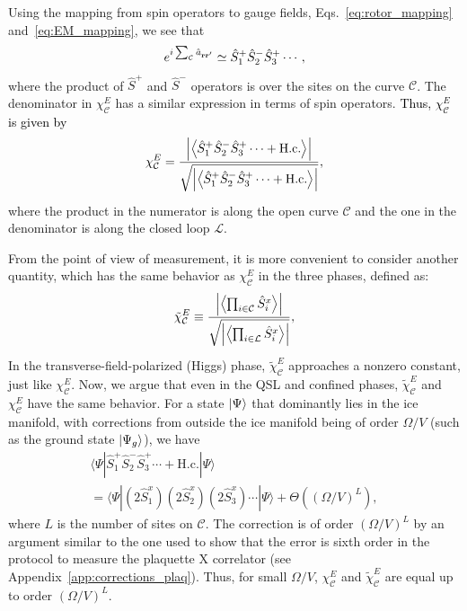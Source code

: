 \documentclass[twocolumn,superscriptaddress,amsmath,amssymb,aps,prx,nofootinbib]{revtex4-2}
\newcommand{\newtext}[1]{\textcolor{black}{#1}}
\begin{document}
Using the mapping from spin operators to gauge fields, Eqs.~\eqref{eq:rotor_mapping} and~\eqref{eq:EM_mapping}, we see that
\begin{equation} 
   e^{i\sum_\mathcal{C} \hat{a}_{\vb{r} \vb{r}'}} \simeq \hat{S}_1^+\hat{S}_2^-\hat{S}_3^+\cdots,
\end{equation}
where the product of $\hat{S}^+$ and $ \hat{S}^-$ operators is over the sites on the curve $\mathcal{C}$.
The denominator in $\chi_{\mathcal{C}}^E$ has a similar expression in terms of spin operators. \newtext{Thus, $\chi_{\mathcal{C}}^{E}$ is given by}
\begin{equation}\label{eq:FM_e_plus_minus}
      \chi_{\mathcal{C}}^E = \frac{\abs{ \expval{ \hat{S}_1^+\hat{S}_2^-\hat{S}_3^+\cdots +\text{H.c.} } } }{\sqrt{ \abs{ \expval{ \hat{S}_1^+\hat{S}_2^-\hat{S}_3^+\cdots + \text{H.c.} }  }}},
\end{equation}
where the product in the numerator is along the open curve $\mathcal{C}$ and the one in the denominator is along the closed loop $\mathcal{L}$.

From the point of view of measurement, it is more convenient to consider another quantity,  which has the same behavior as $\chi_\mathcal{C}^E$ in the three phases, defined as:
\begin{equation}
\tilde{\chi}_\mathcal{C}^E \equiv \frac{\abs{ \expval{ \prod_{i\in \mathcal{C}} \hat{S}_i^x  } } }{\sqrt{ \abs{ \expval{ \prod_{i\in \mathcal{L}} \hat{S}_i^x  }  }}},
\end{equation}
In the transverse-field-polarized (Higgs) phase, $\tilde{\chi}_\mathcal{C}^E$ approaches a nonzero constant, just like $\chi_\mathcal{C}^E$. Now, we argue that even in the QSL and confined phases, $\tilde{\chi}_\mathcal{C}^E$ and $\chi_\mathcal{C}^E$ have the same behavior.  
For a state $\ket{\Psi} $ that dominantly lies in the ice manifold, with corrections from outside the ice manifold being of order $\Omega/V$ (such as the ground state $\ket{\Psi_g}$),  we have
\begin{multline}
  \langle \Psi | \hat{S}_1^+ \hat{S}_2^- \hat{S}_3^+ \cdots + \text{H.c.} | \Psi \rangle \\ = \langle \Psi | (2\hat{S}_1^x) (2\hat{S}_2^x) (2\hat{S}_3^x) \cdots |\Psi \rangle + \Theta \left( (\Omega/V)^L \right),
\end{multline}
where $L$ is the number of sites on $\mathcal{C}$. The correction is of order $( \Omega/V )^L$ by an argument similar to the one used to show that the error is sixth order in the protocol to measure the plaquette X correlator (see Appendix~\ref{app:corrections_plaq}). Thus, for small $\Omega/V$, $\chi_\mathcal{C}^E$ and $\tilde{\chi}_\mathcal{C}^E$ are equal up to order $(\Omega/V)^L$. 
\end{document}
